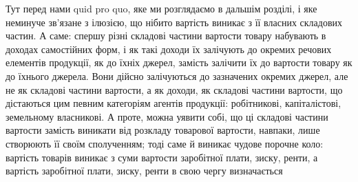 Тут перед нами quid pro quo, яке ми розглядаємо в дальшім розділі, і
яке неминуче зв’язане з ілюзією, що нібито вартість виникає з її власних
складових частин. А саме: спершу різні складові частини вартости товару набувають
в доходах самостійних форм, і як такі доходи їх залічують до окремих
речових елементів продукції, як до їхніх джерел, замість залічити їх до
вартости товару як до їхнього джерела. Вони дійсно залічуються до зазначених
окремих джерел, але не як складові частини вартости, а як доходи, як складові
частини вартости, що дістаються цим певним категоріям агентів продукції: робітникові,
капіталістові, земельному власникові. А проте, можна уявити собі, що
ці складові частини вартости замість виникати від розкладу товарової вартости,
навпаки, лише створюють її своїм сполученням; тоді саме й виникає чудове
порочне коло: вартість товарів виникає з суми вартости заробітної плати, зиску,
ренти, а вартість заробітної плати, зиску, ренти в свою чергу визначається
